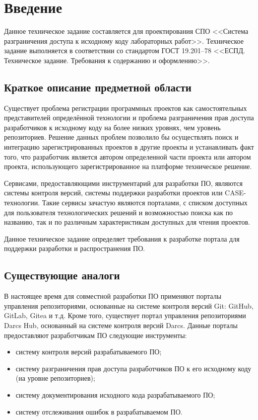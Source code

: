 \documentclass{bmstu}
\begin{document}
  \chapter{Введение}

  Данное техническое задание составляется для проектирования СПО
  <<Система разграничения доступа к исходному коду лабораторных
  работ>>.
  Техническое задание выполняется в соответствии со стандартом ГОСТ
  19.201–78 <<ЕСПД. Техническое задание. Требования к содержанию и
  оформлению>>.

  \section{Краткое описание предметной области}

  Существует проблема регистрации программных проектов как
  самостоятельных представителей определённой технологии и проблема
  разграничения прав доступа разработчиков к исходному коду на более
  низких уровнях, чем уровень репозиториев.
  Решение данных проблем позволило бы осуществлять поиск и интеграцию
  зарегистрированных проектов в другие проекты и устанавливать факт
  того, что разработчик является автором определенной части проекта
  или автором проекта, использующего зарегистрированное на платформе
  техническое решение.

  Сервисами, предоставляющими инструментарий для разработки ПО,
  являются системы контроля версий, системы поддержки разработки
  проектов или CASE-технологии.
  Такие сервисы зачастую являются порталами, с списком доступных для
  пользователя технологических решений и возможностью поиска как по
  названию, так и по различным характеристикам доступных для чтения
  проектов.

  Данное техническое задание определяет требования к разработке
  портала для поддержки разработки и распространения ПО.

  \section{Существующие аналоги}

  В настоящее время для совместной разработки ПО применяют порталы
  управления репозиториями, основанные на системе контроля версий Git:
  GitHub, GitLab, Gitea и т.д.
  Кроме того, существует портал управления репозиториями Darcs Hub,
  основанный на системе контроля версий Darcs.
  Данные порталы предоставляют разработчикам ПО следующие инструменты:
  \begin{itemize}[label=---]
    \item систему контроля версий разрабатываемого ПО;
    \item систему разграничения прав доступа разработчиков ПО к его
      исходному коду (на уровне репозиториев);
    \item систему документирования исходного кода разрабатываемого ПО;
    \item систему отслеживания ошибок в разрабатываемом ПО.
  \end{itemize}
\end{document}
